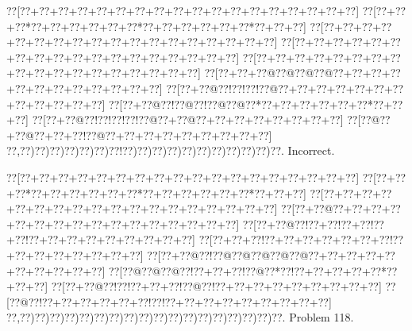 \documentclass[a5paper]{article}
\begin{document}
\begin{center}
{\goo
\0??[\0??+\0??+\0??+\0??+\0??+\0??+\0??+\0??+\0??+\0??+\0??+\0??+\0??+\0??+\0??+\0??+\0??+\0??]
\0??[\0??+\0??+\0??*\0??+\0??+\0??+\0??+\0??+\0??*\0??+\0??+\0??+\0??+\0??+\0??*\0??+\0??+\0??]
\0??[\0??+\0??+\0??+\0??+\0??+\0??+\0??+\0??+\0??+\0??+\0??+\0??+\0??+\0??+\0??+\0??+\0??+\0??]
\0??[\0??+\0??+\0??+\0??+\0??+\0??+\0??+\0??+\0??+\0??+\0??+\0??+\0??+\0??+\0??+\0??+\0??+\0??]
\0??[\0??+\0??+\0??+\0??+\0??+\0??+\0??+\0??+\0??+\0??+\0??+\0??+\0??+\0??+\0??+\0??+\0??+\0??]
\0??[\0??+\0??+\0??@\0??@\0??@\0??@\0??+\0??+\0??+\0??+\0??+\0??+\0??+\0??+\0??+\0??+\0??+\0??]
\0??[\0??+\0??@\0??!\0??!\0??!\0??@\0??+\0??+\0??+\0??+\0??+\0??+\0??+\0??+\0??+\0??+\0??+\0??]
\0??[\0??+\0??@\0??!\0??@\0??!\0??@\0??@\0??*\0??+\0??+\0??+\0??+\0??+\0??*\0??+\0??+\0??]
\0??[\0??+\0??@\0??!\0??!\0??!\0??!\0??@\0??+\0??@\0??+\0??+\0??+\0??+\0??+\0??+\0??+\0??]
\0??[\0??@\0??+\0??@\0??+\0??+\0??!\0??@\0??+\0??+\0??+\0??+\0??+\0??+\0??+\0??+\0??]
\0??,\0??)\0??)\0??)\0??)\0??)\0??)\0??!\0??)\0??)\0??)\0??)\0??)\0??)\0??)\0??)\0??)\0??)\0??.
}
Incorrect. 

\end{center}
\newpage
\begin{center}
{\goo
\0??[\0??+\0??+\0??+\0??+\0??+\0??+\0??+\0??+\0??+\0??+\0??+\0??+\0??+\0??+\0??+\0??+\0??+\0??]
\0??[\0??+\0??+\0??*\0??+\0??+\0??+\0??+\0??+\0??*\0??+\0??+\0??+\0??+\0??+\0??*\0??+\0??+\0??]
\0??[\0??+\0??+\0??+\0??+\0??+\0??+\0??+\0??+\0??+\0??+\0??+\0??+\0??+\0??+\0??+\0??+\0??+\0??]
\0??[\0??+\0??@\0??+\0??+\0??+\0??+\0??+\0??+\0??+\0??+\0??+\0??+\0??+\0??+\0??+\0??+\0??+\0??]
\0??[\0??+\0??@\0??!\0??+\0??!\0??+\0??!\0??+\0??!\0??+\0??+\0??+\0??+\0??+\0??+\0??+\0??+\0??]
\0??[\0??+\0??+\0??!\0??+\0??+\0??+\0??+\0??+\0??+\0??!\0??+\0??+\0??+\0??+\0??+\0??+\0??+\0??]
\0??[\0??+\0??@\0??!\0??@\0??@\0??@\0??@\0??@\0??+\0??+\0??+\0??+\0??+\0??+\0??+\0??+\0??+\0??]
\0??[\0??@\0??@\0??@\0??!\0??+\0??+\0??!\0??@\0??*\0??!\0??+\0??+\0??+\0??+\0??*\0??+\0??+\0??]
\0??[\0??+\0??@\0??!\0??!\0??+\0??+\0??!\0??@\0??!\0??+\0??+\0??+\0??+\0??+\0??+\0??+\0??+\0??]
\0??[\0??@\0??!\0??+\0??+\0??+\0??+\0??+\0??!\0??!\0??+\0??+\0??+\0??+\0??+\0??+\0??+\0??+\0??]
\0??,\0??)\0??)\0??)\0??)\0??)\0??)\0??)\0??)\0??)\0??)\0??)\0??)\0??)\0??)\0??)\0??)\0??)\0??.
}
Problem 118.

\end{center}
\end{document}
